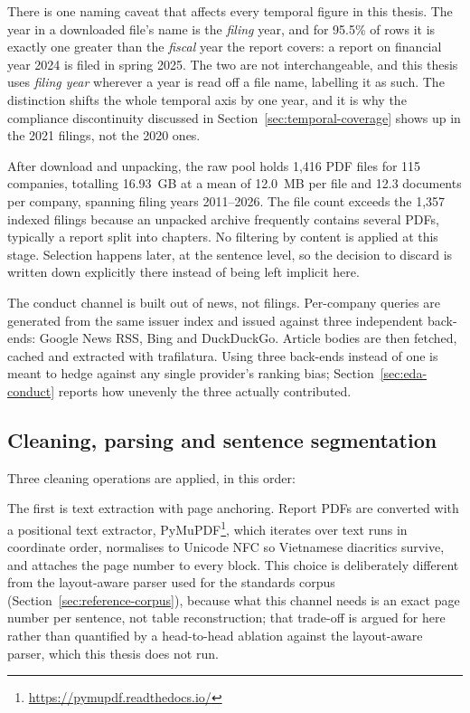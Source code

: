 \documentclass[fontsize=12pt,oneside,headings=small]{scrreprt}
\begin{document}
There is one naming caveat that affects every temporal figure in this thesis. The year in a downloaded file's name is the \emph{filing} year, and for 95.5\% of rows it is exactly one greater than the \emph{fiscal} year the report covers: a report on financial year 2024 is filed in spring 2025. The two are not interchangeable, and this thesis uses \textit{filing year} wherever a year is read off a file name, labelling it as such. The distinction shifts the whole temporal axis by one year, and it is why the compliance discontinuity discussed in Section~\ref{sec:temporal-coverage} shows up in the 2021 filings, not the 2020 ones.

After download and unpacking, the raw pool holds 1,416 PDF files for 115 companies, totalling 16.93~GB at a mean of 12.0~MB per file and 12.3 documents per company, spanning filing years 2011--2026. The file count exceeds the 1,357 indexed filings because an unpacked archive frequently contains several PDFs, typically a report split into chapters. No filtering by
content is applied at this stage. Selection happens later, at the sentence
level, so the decision to discard is written down explicitly there instead of
being left implicit here.

The conduct channel is built out of news, not filings. Per-company queries
are generated from the same issuer index and issued against three
independent back-ends: Google News RSS, Bing and DuckDuckGo. Article bodies
are then fetched, cached and extracted with trafilatura. Using three
back-ends instead of one is meant to hedge against any single provider's
ranking bias; Section~\ref{sec:eda-conduct} reports how unevenly the three
actually contributed.

\subsection{Cleaning, parsing and sentence segmentation}
\label{sec:cleaning}

Three cleaning operations are applied, in this order:

The first is text extraction with page anchoring. Report PDFs are converted with a
positional text extractor, PyMuPDF\footnote{\url{https://pymupdf.readthedocs.io/}},
which iterates over text runs in coordinate order, normalises to Unicode NFC
so Vietnamese diacritics survive, and attaches the page number to every
block. This choice is deliberately different from the layout-aware parser used
for the standards corpus (Section~\ref{sec:reference-corpus}), because what this
channel needs is an exact page number per sentence, not table reconstruction;
that trade-off is argued for here rather than quantified by a head-to-head
ablation against the layout-aware parser, which this thesis does not run.
\end{document}
